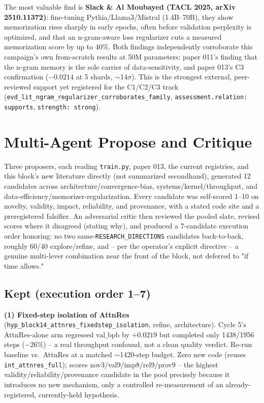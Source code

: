 \documentclass{article}
\newcommand{\valbpb}{\mathrm{val\_bpb}}
\begin{document}
The most valuable find is \textbf{Slack \& Al Moubayed (TACL 2025, arXiv 2510.11372)}: fine-tuning Pythia/Llama3/Mistral (1.4B--70B), they show memorization rises sharply in early epochs, often before validation perplexity is optimized, and that an n-gram-aware loss regularizer cuts a measured memorization score by up to 40\%. Both findings independently corroborate this campaign's own from-scratch results at 50M parameters: paper 011's finding that the n-gram memory is the sole carrier of data-sensitivity, and paper 013's C3 confirmation ($-0.0214$ at 5 shards, $\sim$14$\sigma$). This is the strongest external, peer-reviewed support yet registered for the C1/C2/C3 track (\texttt{evd\_lit\_ngram\_regularizer\_corroborates\_family}, \texttt{assessment.relation: supports}, \texttt{strength: strong}).

\section{Multi-Agent Propose and Critique}
\label{sec:multiagent}
Three proposers, each reading \texttt{train.py}, paper 013, the current registries, and this block's new literature directly (not summarized secondhand), generated 12 candidates across architecture/convergence-bias, systems/kernel/throughput, and data-efficiency/memorizer-regularization. Every candidate was self-scored 1--10 on novelty, validity, impact, reliability, and provenance, with a stated code site and a preregistered falsifier. An adversarial critic then reviewed the pooled slate, revised scores where it disagreed (stating why), and produced a 7-candidate execution order honoring: no two same-\texttt{RESEARCH\_DIRECTIONS} candidates back-to-back, roughly 60/40 explore/refine, and -- per the operator's explicit directive -- a genuine multi-lever combination near the front of the block, not deferred to "if time allows."

\subsection{Kept (execution order 1--7)}
\textbf{(1) Fixed-step isolation of AttnRes} (\texttt{hyp\_block14\_attnres\_fixedstep\_isolation}, refine, architecture). Cycle 5's AttnRes-alone arm regressed $\valbpb$ by $+0.0219$ but completed only 1438/1956 steps ($-26\%$) -- a real throughput confound, not a clean quality verdict. Re-run baseline vs.\ AttnRes at a matched $\sim$1420-step budget. Zero new code (reuses \texttt{int\_attnres\_full}); scores nov3/val9/imp8/rel9/prov9 -- the highest validity/reliability/provenance candidate in the pool precisely because it introduces no new mechanism, only a controlled re-measurement of an already-registered, currently-held hypothesis.
\end{document}
